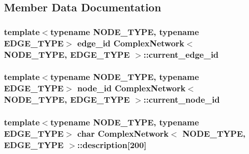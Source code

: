 \subsection{Member Data Documentation}
\hypertarget{class_complex_network_a5305dba65a6d949064e46a6729c39e53}{
\subsubsection[{current\+\_\+edge\+\_\+id}]{\setlength{\rightskip}{0pt plus 5cm}template$<$typename N\+O\+D\+E\+\_\+\+T\+Y\+P\+E, typename E\+D\+G\+E\+\_\+\+T\+Y\+P\+E$>$ {\bf edge\+\_\+id} {\bf Complex\+Network}$<$ N\+O\+D\+E\+\_\+\+T\+Y\+P\+E, E\+D\+G\+E\+\_\+\+T\+Y\+P\+E $>$\+::current\+\_\+edge\+\_\+id\hspace{0.3cm}{\ttfamily [protected]}}}\label{class_complex_network_a5305dba65a6d949064e46a6729c39e53}
\hypertarget{class_complex_network_ab71dc127e36a989049df28f58f2c315a}{
\subsubsection[{current\+\_\+node\+\_\+id}]{\setlength{\rightskip}{0pt plus 5cm}template$<$typename N\+O\+D\+E\+\_\+\+T\+Y\+P\+E, typename E\+D\+G\+E\+\_\+\+T\+Y\+P\+E$>$ {\bf node\+\_\+id} {\bf Complex\+Network}$<$ N\+O\+D\+E\+\_\+\+T\+Y\+P\+E, E\+D\+G\+E\+\_\+\+T\+Y\+P\+E $>$\+::current\+\_\+node\+\_\+id\hspace{0.3cm}{\ttfamily [protected]}}}\label{class_complex_network_ab71dc127e36a989049df28f58f2c315a}
\hypertarget{class_complex_network_abc2c2def62701d56ec56c8b0accbedb9}{
\subsubsection[{description}]{\setlength{\rightskip}{0pt plus 5cm}template$<$typename N\+O\+D\+E\+\_\+\+T\+Y\+P\+E, typename E\+D\+G\+E\+\_\+\+T\+Y\+P\+E$>$ char {\bf Complex\+Network}$<$ N\+O\+D\+E\+\_\+\+T\+Y\+P\+E, E\+D\+G\+E\+\_\+\+T\+Y\+P\+E $>$\+::description\mbox{[}200\mbox{]}}}\label{class_complex_network_abc2c2def62701d56ec56c8b0accbedb9}
